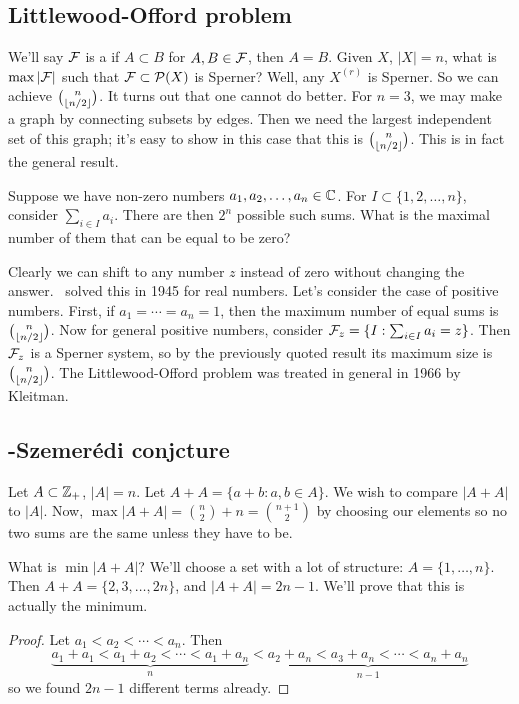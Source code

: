 \subsection*{Littlewood-Offord problem}
We'll say $\mathcal{F}$ is a  if $A\subset B$ for $A,B\in \mathcal{F}$, then  $A=B$.
Given $X$, $|X|=n$, what is $\max |\mathcal{F}|$ such that $\mathcal{F}\subset \mathcal{P}(X)$ is Sperner? Well, any $X^{(r)}$ is Sperner. So we can achieve ${n \choose \lfloor n/2\rfloor }$. It turns out that one cannot do better. For $n=3$, we may make a graph by connecting subsets by edges. Then we need the largest independent set of this graph; it's easy to show in this case that this is ${n \choose \lfloor n/2\rfloor }$. This is in fact the general result.
\begin{problem} 
Suppose we have non-zero numbers $a_1,a_2,\ldots,a_n \in \mathbb{C}$. For $I\subset \{1,2,\dotsc,n\}$, consider $\sum_{i\in I} a_i$. There are then $2^n$ possible such sums. What is the maximal number of them that can be equal to be zero? 
\end{problem}
Clearly we can shift to any number $z$ instead of zero without changing the answer.  \erdos\ solved this in 1945 for real numbers. Let's consider the case of positive numbers. 
First, if $a_1=\dotsm = a_n=1$, then the maximum number of equal sums is ${n \choose \lfloor n/2\rfloor }$. 
Now for general positive numbers, consider $\mathcal{F}_z = \{ I: \sum_{i\in I} a_i = z\}$. Then $\mathcal{F}_z$ is a Sperner system, so by the previously quoted result its maximum size is ${n \choose \lfloor n/2\rfloor }$.
The Littlewood-Offord problem was treated in general in 1966 by Kleitman.

\subsection*{\erdos-Szemer\'edi conjcture}
Let $A\subset \mathbb{Z}_+$, $|A| = n$. Let $A+A = \{ a+b: a,b\in A\}$. We wish to compare $|A+A|$ to $|A|$.
Now, $\max |A+A| = {n \choose 2} + n = {n+1 \choose 2}$ by choosing our elements so no two sums are the same unless they have to be.

What is $\min|A+A|$?
We'll choose a set with a lot of structure: $A= \{1,\dotsc,n\}$. Then $A+A = \{2,3,\dotsc,2n\}$, and $|A+A| = 2n-1$. We'll prove that this is actually the minimum.
\begin{proof}  
Let $a_1  < a_2  <\dotsm < a_n$. Then
\[
\underbrace{a_1 + a_1 < a_1 + a_2 < \dotsm < a_1 + a_n}_{n} < \underbrace{a_2 + a_n < a_3 + a_n < \dotsm < a_n + a_n}_{n-1}
\]
so we found $2n-1$ different terms already.
\end{proof}

